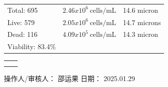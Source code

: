 \documentclass[UTF8,10pt,a4paper,fontset=fandol]{ctexart}
\newcommand{\fieldvalue}[1]{#1}
\newcommand{\handwritten}[1]{#1}
\begin{document}
\begin{center}
\begin{center}
\begin{tabularx}{\textwidth}{XXX}
Total:
\fieldvalue{695}
&
\fieldvalue{$2.46x10^6\ \mathrm{cells/mL}$}
&
\fieldvalue{14.6 micron}
\\

Live:
\fieldvalue{579}
&
\fieldvalue{$2.05x10^6\ \mathrm{cells/mL}$}
&
\fieldvalue{14.7 microns}
\\

Dead:
\fieldvalue{116}
&
\fieldvalue{$4.09x10^5\ \mathrm{cells/mL}$}
&
\fieldvalue{14.3 micron}
\\

Viability:
\fieldvalue{83.4\%}
&
&
\end{tabularx}

\vspace{0.5em}

\begin{center}
\begin{tabular}{cc}
\fbox{\rule{0pt}{4.0cm}\rule{0.43\textwidth}{0pt}} &
\fbox{\rule{0pt}{4.0cm}\rule{0.43\textwidth}{0pt}} \\[1em]
\fbox{\rule{0pt}{4.0cm}\rule{0.43\textwidth}{0pt}} &
\fbox{\rule{0pt}{4.0cm}\rule{0.43\textwidth}{0pt}}
\end{tabular}
\end{center}

\vfill

操作人/审核人：
\fieldvalue{\handwritten{邵运果}}
\hfill
日期：
\fieldvalue{\handwritten{2025.01.29}}

\newpage


\end{center}
\end{center}
\end{document}
